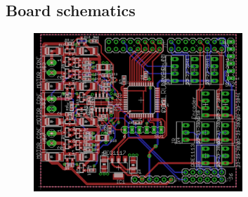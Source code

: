 \subsection{Board schematics}
\begin{figure}[!ht]
	\centering
	\includegraphics[width=0.7\textwidth]{figures/BoardSche.PNG}
	\caption{}
	\label{Hardware diagram}
\end{figure}

